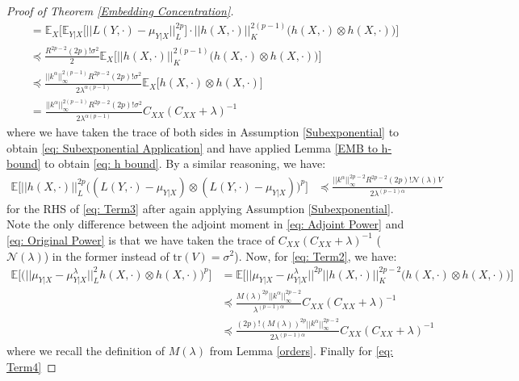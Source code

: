 \documentclass[accepted]{article}
\theoremstyle{definition}
\begin{document}
\begin{proof}[Proof of Theorem \ref{Embedding Concentration}]
\begin{align}
    & = \mathbb{E}_{X}\Big[\mathbb{E}_{Y|X}\Big[||L(Y, \cdot) - \mu_{Y|X}||_{L}^{2p}\Big] \cdot  ||h(X, \cdot)||_{K}^{2(p - 1)}\Big(h(X, \cdot) \otimes h(X, \cdot)\Big)\Big] \nonumber \\
    & \preccurlyeq \frac{R^{2p -  2}(2p)!\sigma^2}{2}\mathbb{E}_{X}\Big[||h(X, \cdot)||_K^{2(p - 1)}\Big(h(X, \cdot) \otimes h(X, \cdot)\Big)\Big] \label{eq: Subexponential Application} \\
    & \preccurlyeq \frac{||k^{\alpha}||^{2(p - 1)}_{\infty}R^{2p -  2}(2p)!\sigma^2}{2\lambda^{\alpha(p - 1)}} \mathbb{E}_X\Big[h(X, \cdot) \otimes h(X, \cdot)\Big] \label{eq: h bound} \\
    & = \frac{||k^{\alpha}||^{2(p-1)}_{\infty}R^{2p -  2}(2p)!\sigma^2}{2\lambda^{\alpha(p-1)}}C_{XX}(C_{XX} + \lambda)^{-1} \label{eq: Original Power}
\end{align}
where we have taken the trace of both sides in Assumption \ref{Subexponential} to obtain \eqref{eq: Subexponential Application} and have applied Lemma \ref{EMB to h-bound} to obtain \eqref{eq: h bound}. By a similar reasoning, we have:
\begin{align}
    \mathbb{E}\Big[||h(X, \cdot)||^{2p}_{L} \Big((L(Y, \cdot) - \mu_{Y|X}) \otimes (L(Y, \cdot) - \mu_{Y|X})\Big)^{p}\Big] & \preccurlyeq \frac{||k^{\alpha}||^{2p-2}_{\infty}R^{2p -  2}(2p)!\mathcal{N}(\lambda)V}{2\lambda^{(p-1)\alpha}} \label{eq: Adjoint Power}
\end{align}
for the RHS of \eqref{eq: Term3} after again applying Assumption \ref{Subexponential}. Note the only difference between the adjoint moment in \eqref{eq: Adjoint Power} and \eqref{eq: Original Power} is that we have taken the trace of $C_{XX}(C_{XX} + \lambda)^{-1}$ ($\mathcal{N}(\lambda)$) in the former instead of $\text{tr}(V) = \sigma^2$). Now, for \eqref{eq: Term2}, we have:
\begin{align*}
    \mathbb{E}\Big[\Big(||\mu_{Y | X} - \mu^{\lambda}_{Y | X}||^2_L h(X, \cdot) \otimes h(X, \cdot) \Big)^p\Big] & = \mathbb{E}\Big[||\mu_{Y | X} - \mu^{\lambda}_{Y | X}||^{2p}||h(X, \cdot)||_{K}^{2p - 2}\Big(h(X, \cdot) \otimes h(X, \cdot)\Big)\Big] \\
    & \preccurlyeq \frac{M(\lambda)^{2p}||k^{\alpha}||_{\infty}^{2p - 2}}{\lambda^{(p - 1)\alpha}}C_{XX}(C_{XX} + \lambda)^{-1} \\
    & \preccurlyeq \frac{(2p)!(M(\lambda))^{2p}||k^{\alpha}||_{\infty}^{2p - 2}}{2\lambda^{(p - 1)\alpha}}C_{XX}(C_{XX} + \lambda)^{-1} 
\end{align*}
where we recall the definition of $M(\lambda)$ from Lemma \ref{orders}. Finally for \eqref{eq: Term4}

\end{proof}
\end{document}
